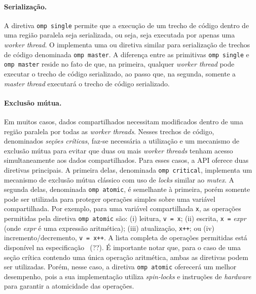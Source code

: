 \documentclass{SBCbookchapter}
\begin{document}
		\paragraph{Serialização.} A diretiva \texttt{omp single} permite
		que a execução de um trecho de código dentro de uma região
		paralela seja serializada, ou seja, seja executada por apenas
		uma \textit{worker thread}. O \openmp implementa uma ou diretiva
		similar para serialização de trechos de código denominada
		\texttt{omp master}. A diferença entre as primitivas \texttt{omp
		single} e \texttt{omp master} reside no fato de que, na
		primeira, qualquer \textit{worker thread} pode executar o trecho
		de código serializado, ao passo que, na segunda, somente a
		\textit{master thread} executará o trecho de código serializado.
		
		\paragraph{Exclusão mútua.} Em muitos casos, dados
		compartilhados necessitam modificados dentro de uma região
		paralela por todas as \textit{worker threads}. Nesses trechos de
		código, denominados \textit{seções críticas}, faz-se necessária
		a utilização e um mecanismo de exclusão mútua para evitar que
		duas ou mais \textit{worker threads} tenham acesso
		simultaneamente aos dados compartilhados.  Para esses casos, a
		API \openmp oferece duas diretivas principais. A primeira delas,
		denominada \texttt{omp critical}, implementa um mecanismo de
		exclusão mútua clássico com uso de \textit{locks} similar ao
		\textit{mutex}. A segunda delas, denominada \texttt{omp atomic},
		é semelhante à primeira, porém somente pode ser utilizada para
		proteger operações simples sobre uma variável compartilhada.
		Por exemplo, para uma variável compartilhada \texttt{x}, as
		operações permitidas pela diretiva \texttt{omp atomic} são: (i)
		leitura, \eg \texttt{v = x}; (ii) escrita, \eg \texttt{x =}
		\textit{expr} (onde \textit{expr} é uma expressão aritmética);
		(iii) atualização, \eg \texttt{x++}; ou (iv)
		incremento/decremento, \eg \texttt{v = x++}. A lista completa de
		operações permitidas está disponível na especificação
		\openmp~(??).  É
		importante notar que, para o caso de uma seção crítica contendo
		uma única operação aritmética, ambas as diretivas podem ser
		utilizadas. Porém, nesse caso, a diretiva \texttt{omp atomic}
		oferecerá um melhor desempenho, pois a sua implementação utiliza
		\textit{spin-locks} e instruções de \textit{hardware} para
		garantir a atomicidade das operações.
		
\end{document}
